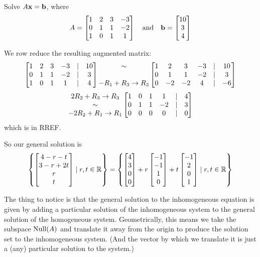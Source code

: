 \begin{myprob} Solve $A\mathbf{x} = \mathbf{b}$, where
$$
A = \left[ \begin{matrix} 
1 & 2 & 3 &-3\\ 
0 & 1 & 1 &-2\\ 
1 & 0 & 1 & 1 \end{matrix} \right] \quad \textrm{and} \quad \mathbf{b} = \left[ \begin{matrix} 10 \\ 3\\ 4 \end{matrix} \right]
$$

\begin{mysol} We row reduce the resulting augmented matrix:
$$
\left[ \begin{matrix} 
1 & 2 & 3 &-3&|&10\\ 
0 & 1 & 1 &-2&|&3\\ 
1 & 0 & 1 & 1&|&4 \end{matrix} \right]
\begin{matrix} \sim\\ \\ -R_1+R_3 \to R_3 \end{matrix}
\left[ \begin{matrix} 
1 & 2 & 3 &-3&|&10\\ 
0 & 1 & 1 &-2&|&3\\ 
0 & -2 & -2 & 4&|&-6 \end{matrix} \right]
$$
$$
\begin{matrix} 2R_2+R_3 \to R_3\\ \sim \\ -2R_2+R_1 \to R_1 \end{matrix}
\left[ \begin{matrix} 
1 & 0 & 1 &1&|&4\\ 
0 & 1 & 1 &-2&|&3\\ 
0 & 0 & 0 & 0&|&0 \end{matrix} \right]
$$
which is in RREF.  

So our general solution is
$$
\left\{ \left[ \begin{matrix} 4-r-t\\3-r+2t\\r\\t \end{matrix} \right] \mid r,t\in\mathbb{R}\right\}
= \left\{ \left[ \begin{matrix} 4\\3\\0\\0 \end{matrix} \right]+r\left[ \begin{matrix} -1\\-1\\1\\0 \end{matrix} \right] +t\left[ \begin{matrix} -1\\2\\0\\1 \end{matrix} \right] \mid r,t\in\mathbb{R}\right\}
$$
\end{mysol}\end{myprob}

The thing to notice is that the general solution to the inhomogeneous  equation is given by adding a particular solution of the inhomogeneous system to the general solution of the homogeneous system.  Geometrically, this means we take the subspace $\operatorname{Null}(A)$ and translate it away from the origin to produce the solution set to the inhomogeneous system.  (And the vector by which we translate it is just a (any) particular solution to the system.)


